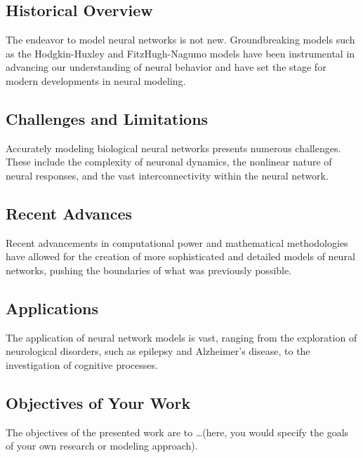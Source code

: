 \documentclass[paper=a4, fontsize=11pt]{scrartcl} %
\numberwithin{equation}{section} %
\numberwithin{figure}{section} %
\numberwithin{table}{section} %
\begin{document}
\subsection{Historical Overview}
The endeavor to model neural networks is not new. Groundbreaking models such as the Hodgkin-Huxley and FitzHugh-Nagumo models have been instrumental in advancing our understanding of neural behavior and have set the stage for modern developments in neural modeling.

\subsection{Challenges and Limitations}
Accurately modeling biological neural networks presents numerous challenges. These include the complexity of neuronal dynamics, the nonlinear nature of neural responses, and the vast interconnectivity within the neural network.

\subsection{Recent Advances}
Recent advancements in computational power and mathematical methodologies have allowed for the creation of more sophisticated and detailed models of neural networks, pushing the boundaries of what was previously possible.

\subsection{Applications}
The application of neural network models is vast, ranging from the exploration of neurological disorders, such as epilepsy and Alzheimer’s disease, to the investigation of cognitive processes.

\subsection{Objectives of Your Work}
The objectives of the presented work are to \ldots (here, you would specify the goals of your own research or modeling approach).







\end{document}
